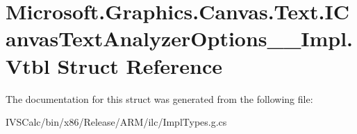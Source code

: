 \hypertarget{struct_microsoft_1_1_graphics_1_1_canvas_1_1_text_1_1_i_canvas_text_analyzer_options_____impl_1_1_vtbl}{}\section{Microsoft.\+Graphics.\+Canvas.\+Text.\+I\+Canvas\+Text\+Analyzer\+Options\+\_\+\+\_\+\+Impl.\+Vtbl Struct Reference}
\label{struct_microsoft_1_1_graphics_1_1_canvas_1_1_text_1_1_i_canvas_text_analyzer_options_____impl_1_1_vtbl}


The documentation for this struct was generated from the following file\+:\begin{DoxyCompactItemize}
\item 
I\+V\+S\+Calc/bin/x86/\+Release/\+A\+R\+M/ilc/Impl\+Types.\+g.\+cs\end{DoxyCompactItemize}
